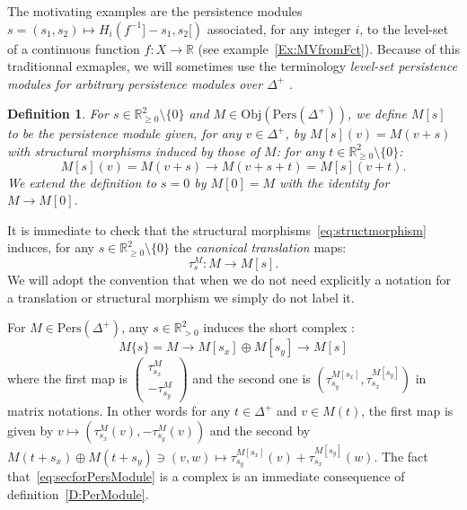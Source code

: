 \documentclass[a4paper, english, 11pt]{article}
\newcommand{\0}{\vec{0}}
\newcommand{\R}[0]{\mathbb{R}}
\newcommand{\Obj}[0]{\text{Obj}}
\newcommand{\Pers}[0]{\text{Pers}}
\newtheorem{defi}[prop]{Definition}
\begin{document}
\smallskip

The motivating examples are the persistence modules $s=(s_1,s_2) \mapsto H_i(f^{-1}]-s_1,s_2[)$ associated, for any integer $i$, to the level-set of a continuous function $f: X\to \R$ (see example~\ref{Ex:MVfromFct}). Because of this traditionnal exmaples, we will sometimes use the terminology \emph{level-set persistence modules for arbitrary  persistence modules over $\Delta^+$ }.

\begin{defi}\label{D:shiftedpersitent} For $s\in \R^2_{\geq 0}\setminus\{0\}$ and $M\in \Obj( \Pers(\Delta^+))$, we define 
$M[s]$ to be the persistence module given, for any $v\in \Delta^+$, by $M[s](v)= M(v+s)$ with structural morphisms induced by those of $M$: for any $t\in \R^2_{\geq 0}\setminus \{0\}$:
$$ M[s](v)=M(v+s) \longrightarrow M(v+s+t)=M[s](v+t).$$
We extend the definition to $s=0$ by $M[0]=M$ with the identity for  $M\to M[0]$.
\end{defi}
It is immediate to check that the structural morphisms~\eqref{eq:structmorphism}
induces, for any $s\in \R^2_{\geq 0}\setminus\{0\}$ the \emph{canonical translation} maps:
\begin{equation}\label{eq:translmorphism}
   \tau_{s}^M: M \longrightarrow M[s].
\end{equation}
We will adopt the convention that when we do not need explicitly a notation for a translation or structural morphism we simply do not label it. 

\smallskip

For $M\in \Pers(\Delta^+)$, any $s\in\R^2_{>0} $ induces the short complex : 
\begin{equation}\label{eq:secforPersModule}
M\{s\} = M \longrightarrow M[s_x]\oplus M[s_y] \longrightarrow M[s] 
\end{equation}
where the first map is $\left( \begin{array}{c} \tau^M_{s_x}\\ -\tau^M_{s_y}\end{array}\right)$ and the second one is $(\tau^{M[s_x]}_{s_y}, \tau^{M[s_y]}_{s_x})$ in matrix notations. In other words for any $t\in \Delta^+$ and  $v\in M(t)$, the first map is given by $v\mapsto (\tau^M_{s_x}(v), - \tau^M_{s_y}(v))$ and the second by 
$M(t+s_x)\oplus M(t+s_y) \ni (v,w) \mapsto \tau^{M[s_x]}_{s_y}(v)+\tau^{M[s_y]}_{s_x}(w)$. 
The fact that~\eqref{eq:secforPersModule} is a complex is an immediate consequence of definition~\ref{D:PerModule}.
\end{document}
